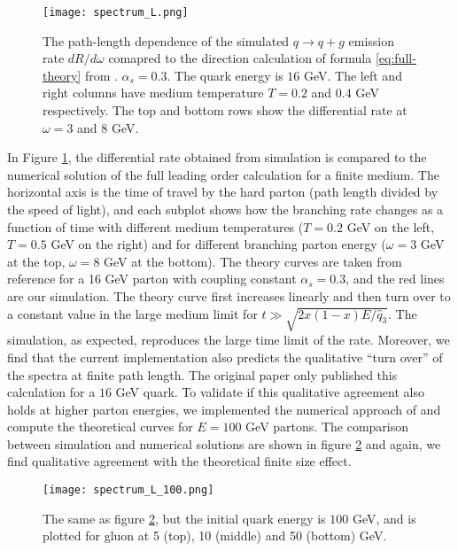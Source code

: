 \begin{figure}
\centering
\texttt{[image: spectrum\_L.png]}
\caption{The path-length dependence of the simulated $q\rightarrow q+g$ emission rate $dR/d\omega$ comapred to the direction calculation of formula \ref{eq:full-theory} from \cite{CaronHuot:2010bp}. $\alpha_s = 0.3$. The quark energy is $16$ GeV. The left and right columns have medium temperature $T=0.2$ and $0.4$ GeV respectively. The top and bottom rows show the differential rate at $\omega = 3$ and $8$ GeV.}
\label{fig:spectra-L-alphas=0.3}
\end{figure}

In Figure \ref{fig:spectra-L-alphas=0.3}, the differential rate obtained from simulation is compared to the numerical solution of the full leading order calculation for a finite medium.
The horizontal axis is the time of travel by the hard parton (path length divided by the speed of light), and each subplot shows how the branching rate changes as a function of time with different medium temperatures ($T=0.2$ GeV on the left, $T=0.5$ GeV on the right) and for different branching parton energy ($\omega=3$ GeV at the top, $\omega=8$ GeV at the bottom).
The theory curves are taken from reference \cite{CaronHuot:2010bp} for a 16 GeV parton with coupling constant $\alpha_s = 0.3$, and the red lines are our simulation.
The theory curve first increases linearly and then turn over to a constant value in the large medium limit for $t \gg \sqrt{2x(1-x)E/\hat{q}_3}$.
The simulation, as expected, reproduces the large time limit of the rate.
Moreover, we find that the current implementation also predicts the qualitative ``turn over'' of the spectra at finite path length.
The original paper only published this calculation for a $16$ GeV quark. 
To validate if this qualitative agreement also holds at higher parton energies, we implemented the numerical approach of \cite{CaronHuot:2010bp} and compute the theoretical curves for $E=100$ GeV partons.
The comparison between simulation and numerical solutions are shown in figure \ref{fig:spectra-L-alphas=0.3-E100} and again, we find qualitative agreement with the theoretical finite size effect.

\begin{figure}
\centering
\texttt{[image: spectrum\_L\_100.png]}
\caption{The same as figure \ref{fig:spectra-L-alphas=0.3-E100}, but the initial quark energy is $100$ GeV, and is plotted for gluon at 5 (top), 10 (middle) and 50 (bottom) GeV.}
\label{fig:spectra-L-alphas=0.3-E100}
\end{figure}

